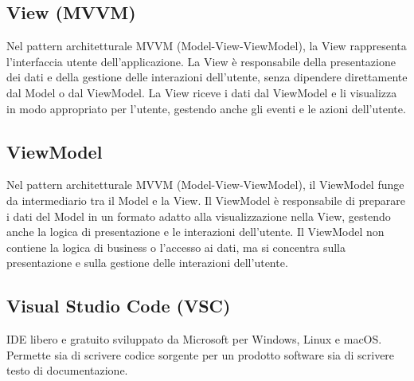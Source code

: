 \subsection*{View (MVVM)}
Nel pattern architetturale MVVM (Model-View-ViewModel), la View rappresenta l'interfaccia utente dell'applicazione. La View è responsabile della
presentazione dei dati e della gestione delle interazioni dell'utente, senza dipendere direttamente dal Model o dal ViewModel. La View riceve i dati
dal ViewModel e li visualizza in modo appropriato per l'utente, gestendo anche gli eventi e le azioni dell'utente.

\hypertarget{sec:viewmodel}{}
\subsection*{ViewModel}
Nel pattern architetturale MVVM (Model-View-ViewModel), il ViewModel funge da intermediario tra il Model e la View. Il ViewModel è responsabile di
preparare i dati del Model in un formato adatto alla visualizzazione nella View, gestendo anche la logica di presentazione e le interazioni dell'utente.
Il ViewModel non contiene la logica di business o l'accesso ai dati, ma si concentra sulla presentazione e sulla gestione delle interazioni dell'utente.

\hypertarget{sec:VSC}{}
\subsection*{Visual Studio Code (VSC)}
IDE libero e gratuito sviluppato da Microsoft per Windows, Linux e macOS. Permette sia di scrivere codice 
sorgente per un prodotto software sia di scrivere testo di documentazione.

\newpage